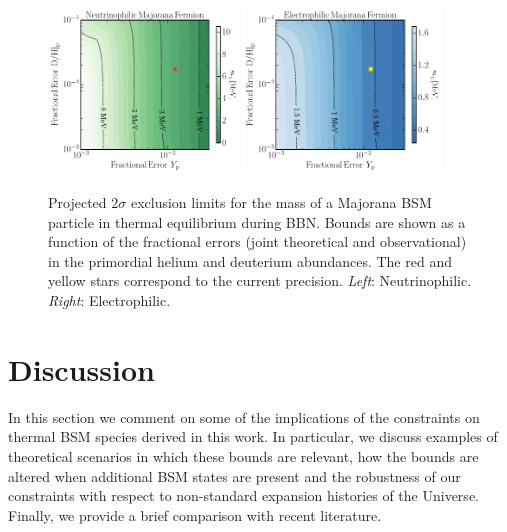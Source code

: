 \documentclass[notitlepage,letterpaper,natbib,aps,prd,onecolumn,amsmath,amsfonts,nofootinbib,preprintnumbers,superscriptaddress,secnumarabic,groupedaddress]{revtex4-1}
\begin{document}
\begin{figure}[t]
    \centering
    \includegraphics[width=0.45\textwidth]{figures/Nu_Maj_Errors_Levels.pdf} \qquad
    \includegraphics[width=0.465\textwidth]{figures/EE_Maj_Errors_Levels.pdf} 
    \caption{Projected $2\sigma$ exclusion limits for the mass of a Majorana BSM particle in thermal equilibrium during BBN. Bounds are shown as a function of the fractional errors (joint theoretical and observational) in the primordial helium and deuterium abundances. The red and yellow stars correspond to the current precision. \emph{Left}: Neutrinophilic. \emph{Right}: Electrophilic.}
    \label{fig:futureBBN}
\end{figure}


\section{Discussion}\label{sec:discussion}
In this section we comment on some of the implications of the constraints on thermal BSM species derived in this work. In particular, we discuss examples of theoretical scenarios in which these bounds are relevant, how the bounds are altered when additional BSM states are present and the robustness of our constraints with respect to non-standard expansion histories of the Universe. Finally, we provide a brief comparison with recent literature. 
\end{document}
